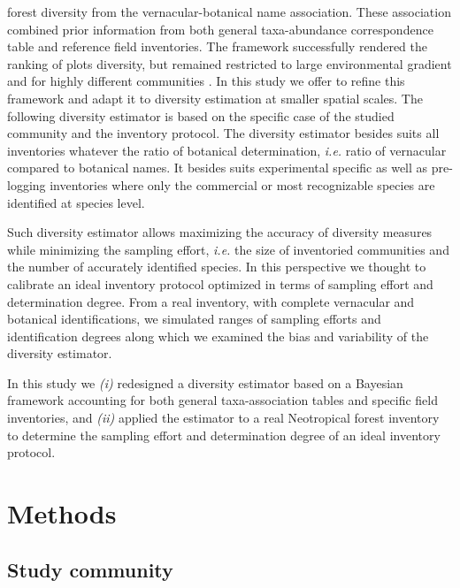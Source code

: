 \documentclass[fleqn,10pt]{ArtEcoFoG} %
\begin{document}
forest diversity from the vernacular-botanical name association. These
association combined prior information from both general taxa-abundance
correspondence table \citep{Molino2009} and reference field inventories.
The framework successfully rendered the ranking of plots diversity, but
remained restricted to large environmental gradient and for highly
different communities \citep{Guitet2014b, Guitet2013}. In this study we
offer to refine this framework and adapt it to diversity estimation at
smaller spatial scales. The following diversity estimator is based on
the specific case of the studied community and the inventory protocol.
The diversity estimator besides suits all inventories whatever the ratio
of botanical determination, \emph{i.e.} ratio of vernacular compared to
botanical names. It besides suits experimental specific as well as
pre-logging inventories where only the commercial or most recognizable
species are identified at species level.

Such diversity estimator allows maximizing the accuracy of diversity
measures while minimizing the sampling effort, \emph{i.e.} the size of
inventoried communities and the number of accurately identified species.
In this perspective we thought to calibrate an ideal inventory protocol
optimized in terms of sampling effort and determination degree. From a
real inventory, with complete vernacular and botanical identifications,
we simulated ranges of sampling efforts and identification degrees along
which we examined the bias and variability of the diversity estimator.

In this study we \emph{(i)} redesigned a diversity estimator based on a
Bayesian framework accounting for both general taxa-association tables
and specific field inventories, and \emph{(ii)} applied the estimator to
a real Neotropical forest inventory to determine the sampling effort and
determination degree of an ideal inventory protocol.

\section{Methods}\label{methods}

\subsection{Study community}\label{study-community}
\end{document}
